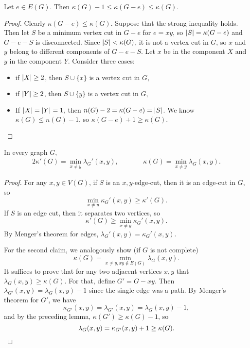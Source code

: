 
\begin{lemma}
  Let $e \in E(G)$.
  Then $\kappa(G)-1 \le \kappa(G-e) \le \kappa(G)$.
\end{lemma}

\begin{proof}
  Clearly $\kappa(G-e) \le \kappa(G)$.
  Suppose that the strong inequality holds.
  Then let $S$ be a minimum vertex cut in $G-e$ for $e=xy$, so $\left| S \right| =
  \kappa(G-e)$ and $G-e-S$ is disconnected.
  Since $\left| S \right| < \kappa(G)$, it is not a vertex cut in $G$, so $x$ and $y$
  belong to different components of $G-e-S$.
  Let $x$ be in the component $X$ and $y$ in the component $Y$.
  Consider three cases:
  \begin{itemize}
  \item if $\left| X \right| \ge 2$, then $S \cup \{x\}$ is a vertex cut in $G$,
  \item if $\left| Y \right| \ge 2$, then $S \cup \{y\}$ is a vertex cut in $G$,
  \item If $\left| X \right| = \left| Y \right| = 1$, then $n(G)-2 = \kappa(G-e) = \left| S \right|$.
	We know $\kappa(G) \le n(G)-1$, so $\kappa(G-e) + 1 \ge \kappa(G)$.
	\qedhere
  \end{itemize}
\end{proof}


\begin{theorem}[Menger]
  In every graph $G$,
  \begin{alignat*}{2}
	\kappa'(G) = \min_{x \ne y} \lambda_G'(x,y),
	& \qquad &
			   \kappa(G) = \min_{x \ne y} \lambda_G(x,y).
  \end{alignat*}
\end{theorem}

\begin{proof}
  For any $x,y \in V(G)$, if $S$ is an $x,y$-edge-cut, then it is an edge-cut in
  $G$, so
  \[
	\min_{x \ne y} \kappa_G'(x,y) \ge \kappa'(G).
  \]
  If $S$ is an edge cut, then it separates two vertices, so
  \[
	\kappa'(G) \ge \min_{x\ne y} \kappa_G'(x,y).
  \]
  By Menger's theorem for edges, $\lambda_G'(x,y) = \kappa_G'(x,y)$.

  For the second claim, we analogously show (if $G$ is not complete)
  \[
	\kappa(G) = \min_{x \ne y, xy \notin E(G)} \lambda_G(x,y).
  \]
  It suffices to prove that for any two adjacent vertices $x,y$ that
  $\lambda_G(x,y) \ge \kappa(G)$.
  For that, define $G' = G - xy$.
  Then $\lambda_{G'}(x,y) = \lambda_G(x,y) - 1$ since the single edge was a
  path.
  By Menger's theorem for $G'$, we have
  \[
	\kappa_{G'}(x,y) = \lambda_{G'}(x,y) = \lambda_G(x,y)-1,
  \]
  and by the preceding lemma, $\kappa(G') \ge \kappa(G)-1$, so
  \[
	\lambda_G(x,y) = \kappa_{G'}(x,y)+1 \ge \kappa(G).
	\qedhere
  \]
\end{proof}


